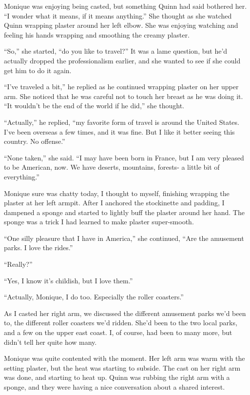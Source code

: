 \begin{thought}
Monique was enjoying being casted, but something Quinn had said bothered her. ``I wonder
what it means, if it means anything.'' She thought as she watched Quinn wrapping plaster around
her left elbow. She was enjoying watching and feeling his hands wrapping and smoothing the
creamy plaster.
\end{thought}

``So,'' she started, ``do you like to travel?'' It was a lame question, but he'd actually
dropped the professionalism earlier, and she wanted to see if she could get him to do it again.

``I've traveled a bit,'' he replied as he continued wrapping plaster on her upper arm. She
noticed that he was careful not to touch her breast as he was doing it. ``It wouldn't be the end
of the world if he did,'' she thought.

``Actually,'' he replied, ``my favorite form of travel is around the United States. I've
been overseas a few times, and it was fine. But I like it better seeing this country. No
offense.''

``None taken,'' she said. ``I may have been born in France, but I am very pleased to be
American, now. We have deserts, mountains, forests- a little bit of everything.''

Monique sure was chatty today, I thought to myself, finishing wrapping the plaster at her
left armpit. After I anchored the stockinette and padding, I dampened a sponge and started to
lightly buff the plaster around her hand. The sponge was a trick I had learned to make plaster
super-smooth.

``One silly pleasure that I have in America,'' she continued, ``Are the amusement parks. I
love the rides.''

``Really?''

``Yes, I know it's childish, but I love them.''

``Actually, Monique, I do too. Especially the roller coasters.''

As I casted her right arm, we discussed the different amusement parks we'd been to, the
different roller coasters we'd ridden. She'd been to the two local parks, and a few on the upper
east coast. I, of course, had been to many more, but didn't tell her quite how many.

Monique was quite contented with the moment. Her left arm was warm with the setting
plaster, but the heat was starting to subside. The cast on her right arm was done, and starting
to heat up. Quinn was rubbing the right arm with a sponge, and they were having a nice
conversation about a shared interest.

